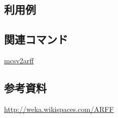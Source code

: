 \subsection*{利用例}

\subsection*{関連コマンド}

\hyperref[sect:mcsv2arff] {mcsv2arff}

\subsection*{参考資料}
\href{http://weka.wikispaces.com/ARFF}{http://weka.wikispaces.com/ARFF}

%
